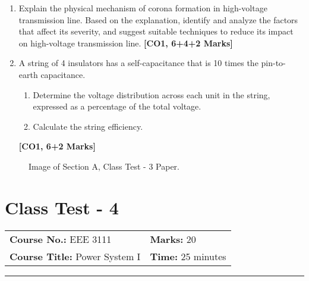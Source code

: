 \documentclass[12pt, a4paper]{article}
\begin{document}
	\begin{enumerate}[label=\textbf{\arabic*.}]
		\item Explain the physical mechanism of corona formation in high-voltage transmission line. Based on the explanation, identify and analyze the factors that affect its severity, and suggest suitable techniques to reduce its impact on high-voltage transmission line. \hfill \textbf{[CO1, 6+4+2 Marks]}
		
		\item A string of 4 insulators has a self-capacitance that is 10 times the pin-to-earth capacitance.
		\begin{enumerate}[label=\textbf{(\roman*)}]
			\item Determine the voltage distribution across each unit in the string, expressed as a percentage of the total voltage.
			\item Calculate the string efficiency.
		\end{enumerate}
		\hfill \textbf{[CO1, 6+2 Marks]}
	\end{enumerate}
	
	\begin{figure}[h!]
		\centering
		\caption{Image of Section A, Class Test - 3 Paper.}
	\end{figure}
	
	\newpage
	
	\section{Class Test - 4}
	\begin{tabular}{ll}
		\textbf{Course No.:} EEE 3111 & \textbf{Marks:} 20 \\
		\textbf{Course Title:} Power System I & \textbf{Time:} 25 minutes \\
	\end{tabular}
	\hrule
	\vspace{0.5cm}
	
\end{document}
